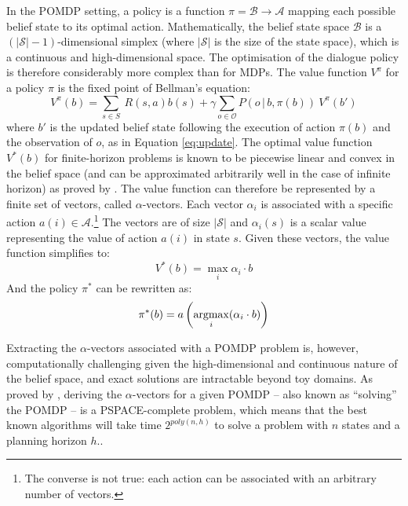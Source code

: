 In the POMDP setting, a policy is a function $\pi = \mathcal{B} \rightarrow \mathcal{A}$ mapping each possible belief state to its optimal action.  Mathematically, the belief state space $\mathcal{B}$ is a $(|\mathcal{S}|\!-\!1)$-dimensional simplex (where $|\mathcal{S}|$ is the size of the state space), which is a continuous and high-dimensional space. The optimisation of the dialogue policy is therefore considerably more complex than for MDPs. The value function $V^{\pi}$ for a policy $\pi$ is the fixed point of Bellman's equation: 
\begin{equation}
V^{\pi}(b) = \sum_{s \in S} \ R(s,a) b(s) + \gamma \sum_{o \in \mathcal{O}} P(o\, |\, b,\pi(b)) \ V^{\pi}(b')
\end{equation}
where $b'$ is the updated belief state following the execution of action $\pi(b)$ and the observation of $o$, as in Equation \eqref{eq:update}.  The optimal value function $V^*(b)$ for finite-horizon problems is known to be piecewise linear and convex in the belief space (and can be approximated arbitrarily well in the case of infinite horizon) as proved by \cite{Sondik1971}. The value function can therefore be represented by a finite set of vectors, called $\alpha$-vectors. Each vector $\alpha_i$ is associated with a specific action $a(i) \in \mathcal{A}$.\footnote{The converse is not true: each action can be associated with an arbitrary number of vectors.}  The vectors are of size $|\mathcal{S}|$ and $\alpha_i(s)$ is a scalar value representing the value of action $a(i)$ in state $s$.  Given these vectors, the value function simplifies to:
\begin{equation}
V^*(b) = \max_{i} \alpha_i \cdot b
\end{equation}
And the policy $\pi^*$ can be rewritten as:
\begin{equation}
\pi^*(b) = a\left(\argmax_i(\alpha_i \cdot b)\right)
\end{equation}

Extracting the $\alpha$-vectors associated with a POMDP problem is, however, computationally challenging given the high-dimensional and continuous nature of the belief space, and exact solutions are intractable beyond toy domains. As proved by \cite{Papadimitriou:1987}, deriving the $\alpha$-vectors for a given POMDP -- also known as ``solving'' the POMDP -- is a PSPACE-complete problem, which means that the best known algorithms will take time $2^{poly(n,h)}$ to solve a problem with $n$ states and a planning horizon $h$..

